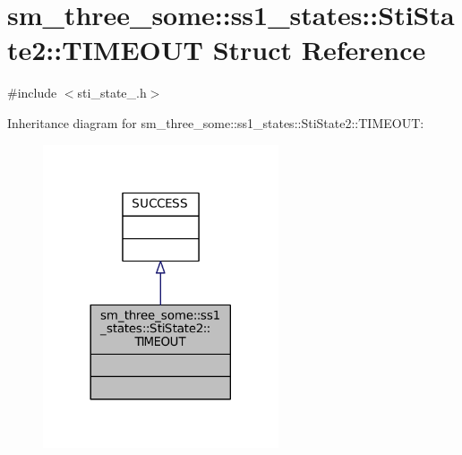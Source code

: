 \hypertarget{structsm__three__some_1_1ss1__states_1_1StiState2_1_1TIMEOUT}{}\section{sm\+\_\+three\+\_\+some\+:\+:ss1\+\_\+states\+:\+:Sti\+State2\+:\+:T\+I\+M\+E\+O\+UT Struct Reference}
\label{structsm__three__some_1_1ss1__states_1_1StiState2_1_1TIMEOUT}


{\ttfamily \#include $<$sti\+\_\+state\+\_.\+h$>$}



Inheritance diagram for sm\+\_\+three\+\_\+some\+:\+:ss1\+\_\+states\+:\+:Sti\+State2\+:\+:T\+I\+M\+E\+O\+UT\+:
\nopagebreak
\begin{figure}[H]
\begin{center}
\leavevmode
\includegraphics[width=197pt]{structsm__three__some_1_1ss1__states_1_1StiState2_1_1TIMEOUT__inherit__graph}
\end{center}
\end{figure}


